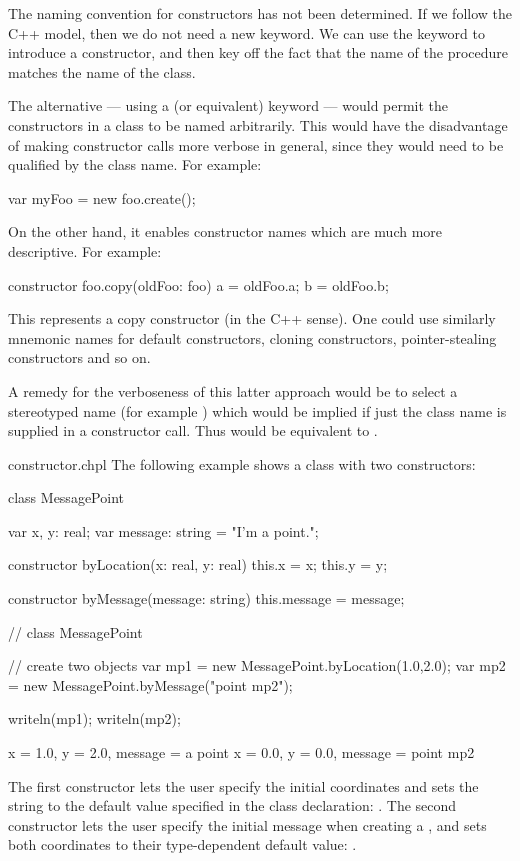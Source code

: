 \begin{openissue}
The naming convention for constructors has not been determined.  If we follow
the C++ model, then we do not need a new keyword.  We can use the 
keyword to introduce a constructor, and then key off the fact that the name of
the procedure matches the name of the class.

The alternative --- using a  (or equivalent) keyword --- would
permit the constructors in a class to be named arbitrarily.  This would have the
disadvantage of making constructor calls more verbose in general, since they
would need to be qualified by the class name.  For example:
\begin{chapel}
var myFoo = new foo.create();
\end{chapel}
On the other hand, it enables constructor names which are much more
descriptive.  For example:
\begin{chapel}
constructor foo.copy(oldFoo: foo) 
{ a = oldFoo.a; b = oldFoo.b; }
\end{chapel}
This represents a copy constructor (in the C++ sense).  One could use similarly
mnemonic names for default constructors, cloning constructors, pointer-stealing constructors and so
on.  

A remedy for the verboseness of this latter approach would be to select a
stereotyped name (for example ) which would be implied if just
the class name is supplied in a constructor call.  Thus  would be equivalent to  .
\end{openissue}

\begin{chapelexample}{constructor.chpl}
The following example shows a class with two constructors:
\begin{chapel}
class MessagePoint {
  var x, y: real;
  var message: string = "I'm a point.";

  constructor byLocation(x: real, y: real) 
  { this.x = x; this.y = y; }

  constructor byMessage(message: string) 
  { this.message = message; }
}  // class MessagePoint

// create two objects
var mp1 = new MessagePoint.byLocation(1.0,2.0);
var mp2 = new MessagePoint.byMessage("point mp2");
\end{chapel}
\begin{chapelpost}
writeln(mp1);
writeln(mp2);
\end{chapelpost}
\begin{chapeloutput}
{x = 1.0, y = 2.0, message = a point}
{x = 0.0, y = 0.0, message = point mp2}
\end{chapeloutput}
The first constructor lets the user specify the initial coordinates
and sets the string to the default value specified in the class
declaration: .  The second constructor lets the user specify the initial message
when creating a , and sets both coordinates to their
type-dependent default value: .
\end{chapelexample}

